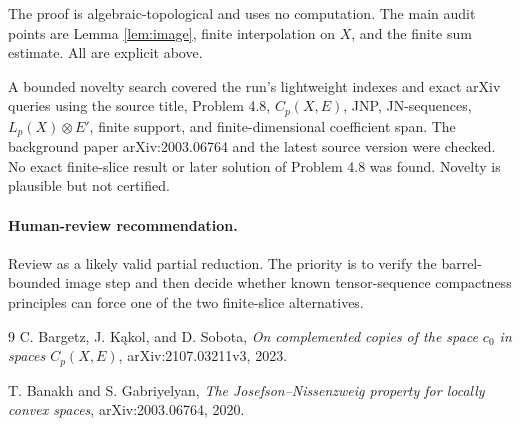 \documentclass[11pt]{article}
\begin{document}
The proof is algebraic-topological and uses no computation.  The main audit
points are Lemma \ref{lem:image}, finite interpolation on $X$, and the finite
sum estimate.  All are explicit above.

A bounded novelty search covered the run's lightweight indexes and exact
arXiv queries using the source title, Problem 4.8, $C_p(X,E)$, JNP,
JN-sequences, $L_p(X)\otimes E'$, finite support, and finite-dimensional
coefficient span.  The background paper arXiv:2003.06764 \cite{BG} and the
latest source version were checked.  No exact finite-slice result or later
solution of Problem 4.8 was found.  Novelty is plausible but not certified.

\paragraph{Human-review recommendation.}
Review as a likely valid partial reduction.  The priority is to verify the
barrel-bounded image step and then decide whether known tensor-sequence
compactness principles can force one of the two finite-slice alternatives.

\begin{thebibliography}{9}
C. Bargetz, J. K\k{a}kol, and D. Sobota,
\emph{On complemented copies of the space $c_0$ in spaces $C_p(X,E)$},
arXiv:2107.03211v3, 2023.

T. Banakh and S. Gabriyelyan,
\emph{The Josefson--Nissenzweig property for locally convex spaces},
arXiv:2003.06764, 2020.
\end{thebibliography}
\end{document}
